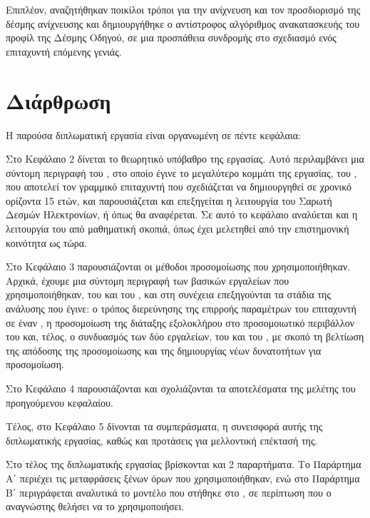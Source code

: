 Επιπλέον, αναζητήθηκαν ποικίλοι τρόποι για την ανίχνευση και τον προσδιορισμό της δέσμης ανίχνευσης και δημιουργήθηκε ο αντίστροφος αλγόριθμος ανακατασκευής του προφίλ της Δέσμης Οδηγού, σε μια προσπάθεια συνδρομής στο σχεδιασμό ενός επιταχυντή επόμενης γενιάς.

\section{Διάρθρωση}
Η παρούσα διπλωματική εργασία είναι οργανωμένη σε πέντε κεφάλαια:

Στο Κεφάλαιο 2 δίνεται το θεωρητικό υπόβαθρο της εργασίας. 
Αυτό περιλαμβάνει μια σύντομη περιγραφή του , στο οποίο έγινε το μεγαλύτερο κομμάτι της εργασίας, του , που αποτελεί τον γραμμικό επιταχυντή που σχεδιάζεται να δημιουργηθεί σε χρονικό ορίζοντα 15 ετών, και παρουσιάζεται και επεξηγείται η λειτουργία του Σαρωτή Δεσμών Ηλεκτρονίων, ή  όπως θα αναφέρεται.
Σε αυτό το κεφάλαιο αναλύεται και η λειτουργία του  από μαθηματική σκοπιά, όπως έχει μελετηθεί από την επιστημονική κοινότητα ως τώρα.

Στο Κεφάλαιο 3 παρουσιάζονται οι μέθοδοι προσομοίωσης που χρησιμοποιήθηκαν.
Αρχικά, έχουμε μια σύντομη περιγραφή των βασικών εργαλείων που χρησιμοποιήθηκαν, του  και του , και στη συνέχεια επεξηγούνται τα στάδια της ανάλυσης που έγινε: ο τρόπος διερεύνησης της επιρροής παραμέτρων του επιταχυντή σε έναν , η προσομοίωση της διάταξης εξολοκλήρου στο προσομοιωτικό περιβάλλον του  και, τέλος, ο συνδυασμός των δύο εργαλείων, του  και του , με σκοπό τη βελτίωση της απόδοσης της προσομοίωσης και της δημιουργίας νέων δυνατοτήτων για προσομοίωση.

Στο Κεφάλαιο 4 παρουσιάζονται και σχολιάζονται τα αποτελέσματα της μελέτης του προηγούμενου κεφαλαίου.

Τέλος, στο Κεφάλαιο 5 δίνονται τα συμπεράσματα, η συνεισφορά αυτής της
διπλωματικής εργασίας, καθώς και προτάσεις για μελλοντική επέκτασή της.

Στο τέλος της διπλωματικής εργασίας βρίσκονται και 2 παραρτήματα.
Το Παράρτημα Α΄ περιέχει τις μεταφράσεις ξένων όρων που χρησιμοποιήθηκαν, ενώ στο Παράρτημα Β΄ περιγράφεται αναλυτικά το μοντέλο που στήθηκε στο , σε περίπτωση που ο αναγνώστης θελήσει να το χρησιμοποιήσει.